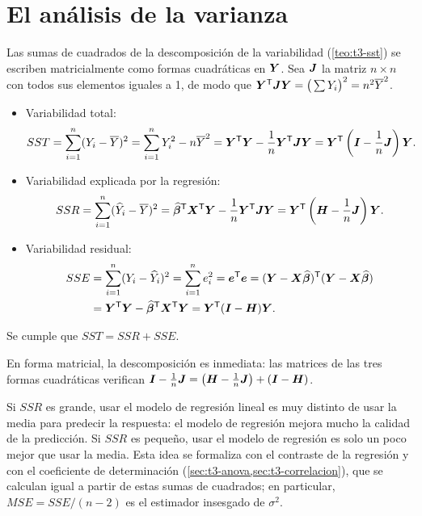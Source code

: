 \section{El análisis de la varianza}
\label{sec:t5-anova}

Las sumas de cuadrados de la descomposición de la variabilidad (\cref{teo:t3-sst}) se escriben
matricialmente como formas cuadráticas en $\bm{Y}$. Sea $\bm{J}$ la matriz $n\times n$ con
todos sus elementos iguales a 1, de modo que $\bm{Y}^{\mathsf{T}}\bm{J}\bm{Y}=\big(\sum Y_i\big)^2=n^2\overline{Y}^2$.

\begin{proposicion}
  \begin{itemize}
    \item Variabilidad total:
      \[
        SST = \sum_{i=1}^{n} (Y_i-\overline{Y})^2 = \sum_{i=1}^{n} Y_i^2-n\overline{Y}^2
        = \bm{Y}^{\mathsf{T}}\bm{Y}-\frac1n\bm{Y}^{\mathsf{T}}\bm{J}\bm{Y}
        = \bm{Y}^{\mathsf{T}}\left(\bm{I}-\frac1n\bm{J}\right)\bm{Y} .
      \]
    \item Variabilidad explicada por la regresión:
      \[
        SSR = \sum_{i=1}^{n} (\widehat{Y}_i-\overline{Y})^2
        = \widehat{\bm{\beta}}^{\mathsf{T}}\bm{X}^{\mathsf{T}}\bm{Y}-\frac1n\bm{Y}^{\mathsf{T}}\bm{J}\bm{Y}
        = \bm{Y}^{\mathsf{T}}\left(\bm{H}-\frac1n\bm{J}\right)\bm{Y} .
      \]
    \item Variabilidad residual:
      \begin{align*}
        SSE &= \sum_{i=1}^{n} (Y_i-\widehat{Y}_i)^2 = \sum_{i=1}^{n} e_i^2 = \bm{e}^{\mathsf{T}}\bm{e}
        = (\bm{Y}-\bm{X}\widehat{\bm{\beta}})^{\mathsf{T}}(\bm{Y}-\bm{X}\widehat{\bm{\beta}}) \\
        &= \bm{Y}^{\mathsf{T}}\bm{Y}-\widehat{\bm{\beta}}^{\mathsf{T}}\bm{X}^{\mathsf{T}}\bm{Y}
        = \bm{Y}^{\mathsf{T}}(\bm{I}-\bm{H})\bm{Y} .
      \end{align*}
  \end{itemize}
  Se cumple que $SST=SSR+SSE$.
\end{proposicion}

En forma matricial, la descomposición es inmediata: las matrices de las tres formas cuadráticas
verifican $\bm{I}-\frac1n\bm{J}=\big(\bm{H}-\frac1n\bm{J}\big)+(\bm{I}-\bm{H})$.

Si $SSR$ es grande, usar el modelo de regresión lineal es muy distinto de usar la media para
predecir la respuesta: el modelo de regresión mejora mucho la calidad de la predicción. Si
$SSR$ es pequeño, usar el modelo de regresión es solo un poco mejor que usar la media. Esta idea
se formaliza con el contraste de la regresión y con el coeficiente de determinación
(\cref{sec:t3-anova,sec:t3-correlacion}), que se calculan igual a partir de estas sumas de
cuadrados; en particular, $MSE=SSE/(n-2)$ es el estimador insesgado de $\sigma^2$.
